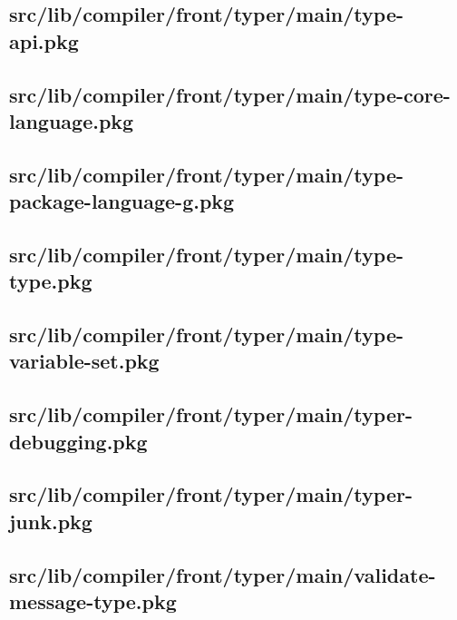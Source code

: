 \subsection{src/lib/compiler/front/typer/main/type-api.pkg}


\subsection{src/lib/compiler/front/typer/main/type-core-language.pkg}


\subsection{src/lib/compiler/front/typer/main/type-package-language-g.pkg}


\subsection{src/lib/compiler/front/typer/main/type-type.pkg}


\subsection{src/lib/compiler/front/typer/main/type-variable-set.pkg}


\subsection{src/lib/compiler/front/typer/main/typer-debugging.pkg}


\subsection{src/lib/compiler/front/typer/main/typer-junk.pkg}


\subsection{src/lib/compiler/front/typer/main/validate-message-type.pkg}


